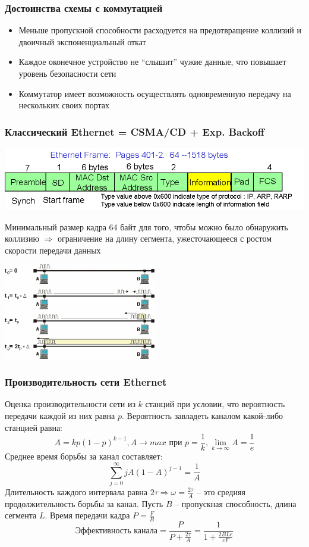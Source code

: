 \documentclass[utf8]{beamer}
\begin{document}
\begin{frame}
\frametitle{Достоинства схемы с коммутацией}
\begin{itemize}
 \item Меньше пропускной способности расходуется на предотвращение коллизий и двоичный экспоненциальный откат
 \item Каждое оконечное устройство не ``слышит'' чужие данные, что повышает уровень безопасности сети
 \item Коммутатор имеет возможность осуществлять одновременную передачу на нескольких своих портах
\end{itemize}
\end{frame}
\begin{frame}
\frametitle{Классический Ethernet = CSMA/CD + Exp. Backoff}
\begin{center}
\includegraphics[width=\textwidth]{pic/ethernet-header.png}
\end{center}
Минимальный размер кадра 64 байт для того, чтобы можно было обнаружить коллизию $\Rightarrow$ ограничение на длину сегмента, ужесточающееся с ростом скорости передачи данных
\begin{center}
\includegraphics[width=0.5\textwidth]{pic/ethernet-collision.png}
\end{center}
\end{frame}
\begin{frame}
\frametitle{Производительность сети Ethernet}
Оценка производительности сети из $k$ станций при условии, что вероятность передачи каждой из них равна $p$. Вероятность завладеть каналом какой-либо станцией равна:
$$
A = kp(1-p)^{k-1}, A\rightarrow max \textrm{ при } p=\frac{1}{k}, \lim_{k\rightarrow\infty}A = \frac{1}{e}
$$
Среднее время борьбы за канал составляет:
$$
\sum_{j=0}^{\infty}jA(1-A)^{j-1} = \frac{1}{A}
$$
Длительность каждого интервала равна $2\tau\Rightarrow\omega = \frac{2\tau}{A}$ -- это средняя продолжительность борьбы за канал. Пусть $B$ -- пропускная способность, длина сегмента $L$. Время передачи кадра $P = \frac{F}{B}$
$$
\textrm{Эффективность канала}=\frac{P}{P+\frac{2\tau}{A}} = \frac{1}{1+\frac{2BLe}{cF}}
$$
\end{frame}
\end{document}
